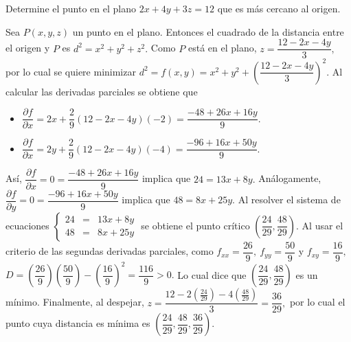 \begin{prob}
Determine el punto en el plano $2x+4y+3z=12$ que es más cercano al origen.
\begin{myproof}
Sea $P(x,y,z)$ un punto en el plano. Entonces el cuadrado de la distancia entre el origen y $P$ es $d^2=x^2+y^2+z^2.$ Como $P$ está en el plano, $z=\dfrac{12-2x-4y}{3},$ por lo cual se quiere minimizar  $d^2=f(x,y)=x^2+y^2+\left( \dfrac{12-2x-4y}{3} \right)^{2}.$
Al calcular las derivadas parciales se obtiene que 
\begin{itemize}
\item $\dfrac{\partial f}{\partial x}=2x+\dfrac{2}{9}\left( 12-2x-4y \right)(-2)=\dfrac{-48+26x+16y}{9}.$
\item $\dfrac{\partial f}{\partial x}=2y+\dfrac{2}{9}\left( 12-2x-4y \right)(-4)=\dfrac{-96+16x+50y}{9}.$
\end{itemize}
Así, $\dfrac{\partial f}{\partial x}=0=\dfrac{-48+26x+16y}{9}$ implica que $24=13x+8y.$ 
Análogamente, $\dfrac{\partial f}{\partial y}=0=\dfrac{-96+16x+50y}{9}$ implica que $48=8x+25y.$ 
Al resolver el sistema de ecuaciones $\left\lbrace \begin{array}{ccc} 24&=&13x+8y\\
48&=&8x+25y \end{array} \right.$ se obtiene el punto crítico $\left( \dfrac{24}{29},\dfrac{48}{29} \right).$ 
Al usar el criterio de las segundas derivadas parciales, como $f_{xx}=\dfrac{26}{9},\ f_{yy}=\dfrac{50}{9}$ y $f_{xy}=\dfrac{16}{9},$ $D=\left(\dfrac{26}{9}\right)\left(\dfrac{50}{9}\right)-\left( \dfrac{16}{9} \right)^{2}=\dfrac{116}{9}>0.$ Lo cual dice que $\left( \dfrac{24}{29},\dfrac{48}{29} \right)$ es un mínimo.
Finalmente, al despejar,  $z=\dfrac{12-2\left( \frac{24}{29} \right)-4\left( \frac{48}{29} \right)}{3}=\dfrac{36}{29}, $ por lo cual el punto  cuya distancia es mínima es $\left(\dfrac{24}{29},\dfrac{48}{29},\dfrac{36}{29}  \right).$ 
\end{myproof}
\end{prob}

